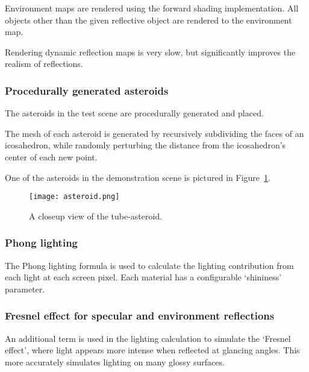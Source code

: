 \documentclass[11pt]{scrartcl} %
\begin{document}
            Environment maps are rendered using the forward shading
            implementation. All objects other than the given reflective object
            are rendered to the environment map.

            Rendering dynamic reflection maps is very slow, but significantly
            improves the realism of reflections.

        \subsubsection{Procedurally generated asteroids}

            The asteroids in the test scene are procedurally generated and
            placed.

            The mesh of each asteroid is generated by recursively subdividing
            the faces of an icosahedron, while randomly perturbing the distance
            from the icosahedron's center of each new point.

            One of the asteroids in the demonstration scene is pictured in Figure~\ref{fig:asteroid}.

            \begin{figure}%
                \centering
                \texttt{[image: asteroid.png]}
                \caption[Asteroid]{
                    A closeup view of the tube-asteroid.
                }
                \label{fig:asteroid}
            \end{figure}

        \subsubsection{Phong lighting}

            The Phong lighting formula is used to calculate the lighting
            contribution from each light at each screen pixel. Each material
            has a configurable `shininess' parameter.

        \subsubsection{Fresnel effect for specular and environment reflections}

            An additional term is used in the lighting calculation to simulate
            the `Fresnel effect', where light appears more intense when
            reflected at glancing angles. This more accurately simulates
            lighting on many glossy surfaces.
\end{document}
